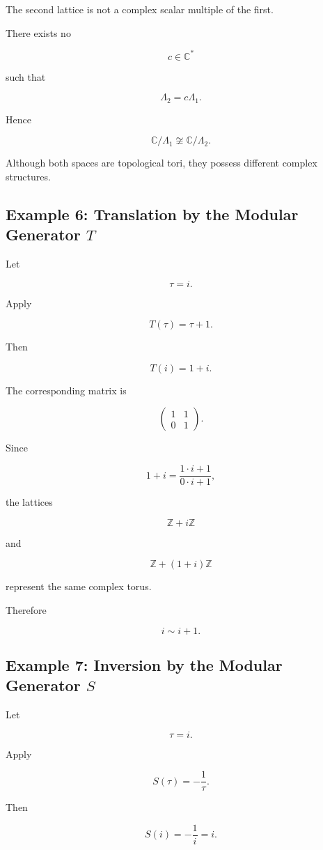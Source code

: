 \documentclass[12pt,a4paper]{article}
\theoremstyle{notespace}
\begin{document}
The second lattice is not a complex scalar multiple of the first.

There exists no

\[
c\in\mathbb C^*
\]

such that

\[
\Lambda_2=c\Lambda_1.
\]

Hence

\[
\boxed{
	\mathbb C/\Lambda_1
	\not\cong
	\mathbb C/\Lambda_2.
}
\]

Although both spaces are topological tori, they possess different
complex structures.

\subsection{Example 6: Translation by the Modular Generator \(T\)}

Let

\[
\tau=i.
\]

Apply

\[
T(\tau)=\tau+1.
\]

Then

\[
T(i)=1+i.
\]

The corresponding matrix is

\[
\begin{pmatrix}
	1&1\\
	0&1
\end{pmatrix}.
\]

Since

\[
1+i
=
\frac{1\cdot i+1}{0\cdot i+1},
\]

the lattices

\[
\mathbb Z+i\mathbb Z
\]

and

\[
\mathbb Z+(1+i)\mathbb Z
\]

represent the same complex torus.

Therefore

\[
\boxed{
	i
	\sim
	i+1.
}
\]

\subsection{Example 7: Inversion by the Modular Generator \(S\)}

Let

\[
\tau=i.
\]

Apply

\[
S(\tau)
=
-\frac1\tau.
\]

Then

\[
S(i)
=
-\frac1i
=
i.
\]
\end{document}
